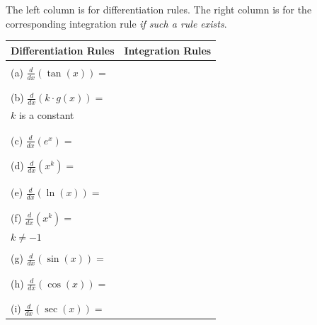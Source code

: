 \documentclass[11pt,fleqn]{article}
\begin{document}
\vspace*{-0.7in}

\begin{center}
  \Large{}
\end{center}

The left column is for differentiation rules. The right column is for the corresponding integration rule \emph{if such a rule exists}.\\

\doublespacing

\begin{tabularx}{\textwidth}{l || l} 
Differentiation Rules & Integration Rules\\ \hline \hline & \\
\hspace*{-.3in}(a) \: $\displaystyle{\frac{d}{dx}\left(\tan(x)\right)=}$ \hspace{2.5in} \quad & \\ &\\ \hline & \\
\hspace*{-.3in}(b) \:  $\displaystyle{ \frac{d}{dx}\left(k\cdot g(x)\right)=}$& \\ 
 $k$ is a constant\\ &\\ \hline & \\
\hspace*{-.3in}(c) \:  $\displaystyle{\frac{d}{dx}\left(e^x\right)=}$ &\\ &\\ \hline & \\
\hspace*{-.3in}(d) \:  $\displaystyle{ \frac{d}{dx}\left(x^k\right)=}$ &\\ &\\ \hline & \\ 
\hspace*{-.3in}(e) \:  $\displaystyle{ \frac{d}{dx}\left(\ln(x)\right)=}$ &\\ &\\ \hline & \\
\hspace*{-.3in}(f) \:  $\displaystyle{ \frac{d}{dx}\left(x^k\right)=}$ &\\ 
$k \not = -1$ &\\ \hline & \\
\hspace*{-.3in}(g) \:  $\displaystyle{ \frac{d}{dx}\left(\sin(x)\right)=}$&\\ &\\ \hline & \\
\hspace*{-.3in}(h) \: $\displaystyle{ \frac{d}{dx}\left(\cos(x)\right)=}$ &\\ &\\ \hline & \\
\hspace*{-.3in}(i) \:  $\displaystyle{ \frac{d}{dx}\left(\sec(x)\right)=}$ &\\ 
 \end{tabularx}
 
\end{document}
